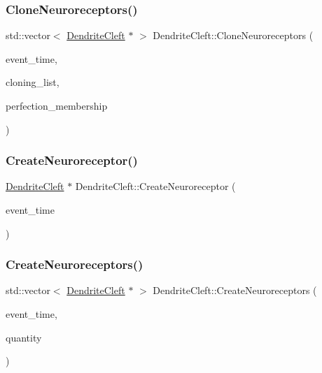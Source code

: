 \subsubsection{\texorpdfstring{Clone\+Neuroreceptors()}{CloneNeuroreceptors()}}
{\footnotesize\ttfamily std\+::vector$<$ \mbox{\hyperlink{classDendriteCleft}{Dendrite\+Cleft}} $\ast$ $>$ Dendrite\+Cleft\+::\+Clone\+Neuroreceptors (\begin{DoxyParamCaption}\item[{std\+::chrono\+::time\+\_\+point$<$ \mbox{\hyperlink{universe_8h_a0ef8d951d1ca5ab3cfaf7ab4c7a6fd80}{Clock}} $>$}]{event\+\_\+time,  }\item[{std\+::vector$<$ \mbox{\hyperlink{classDendriteCleft}{Dendrite\+Cleft}} $\ast$$>$}]{cloning\+\_\+list,  }\item[{double}]{perfection\+\_\+membership }\end{DoxyParamCaption})}

\mbox{\label{classDendriteCleft_ac84d3e0cafecd1436c34162f687e3851}} 
\subsubsection{\texorpdfstring{Create\+Neuroreceptor()}{CreateNeuroreceptor()}}
{\footnotesize\ttfamily \mbox{\hyperlink{classDendriteCleft}{Dendrite\+Cleft}} $\ast$ Dendrite\+Cleft\+::\+Create\+Neuroreceptor (\begin{DoxyParamCaption}\item[{std\+::chrono\+::time\+\_\+point$<$ \mbox{\hyperlink{universe_8h_a0ef8d951d1ca5ab3cfaf7ab4c7a6fd80}{Clock}} $>$}]{event\+\_\+time }\end{DoxyParamCaption})}

\mbox{\label{classDendriteCleft_ab34af5363b25c6498aee429725a1c7db}} 
\subsubsection{\texorpdfstring{Create\+Neuroreceptors()}{CreateNeuroreceptors()}}
{\footnotesize\ttfamily std\+::vector$<$ \mbox{\hyperlink{classDendriteCleft}{Dendrite\+Cleft}} $\ast$ $>$ Dendrite\+Cleft\+::\+Create\+Neuroreceptors (\begin{DoxyParamCaption}\item[{std\+::chrono\+::time\+\_\+point$<$ \mbox{\hyperlink{universe_8h_a0ef8d951d1ca5ab3cfaf7ab4c7a6fd80}{Clock}} $>$}]{event\+\_\+time,  }\item[{int}]{quantity }\end{DoxyParamCaption})}

